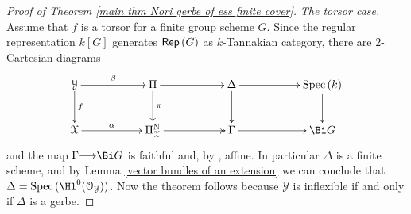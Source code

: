 \documentclass[12pt,reqno]{amsart}
\theoremstyle{plain}
\theoremstyle{definition}
\numberwithin{thm}{section}
\newcounter{x}\setcounter{x}{1}
\theoremstyle{plain}
\begin{document}
\begin{proof}[Proof of Theorem \ref{main thm Nori gerbe of ess finite cover}]
\emph{The torsor case.} Assume that $f$ is a torsor for a finite group scheme $G$. Since the regular
representation $k[G]$ generates ${\text{\sf Rep\,}}(G)$ as $k$-Tannakian category, there are $2$-Cartesian diagrams
$$
\xymatrix{{{\mathcal Y}}\ar[rr]^-\beta\ar[d]^-f&&\Pi\ar[d]^-\pi\ar[rr]&&\Delta\ar[rr]\ar[d]&&{{\rm Spec \,}}(k)\ar[d]\\ {{\mathcal X}}\ar[rr]^-\alpha && \Pi_{{\mathcal X}}^{\textup{N}}\ar@{>>}[rr]&&\Gamma\ar[rr]^-{}&&\Bi G}
$$
and the map $\Gamma{\longrightarrow} \Bi G$ is faithful and, by \cite[Remark B.7]{TZ}, affine. In particular
$\Delta$ is a finite scheme, and by Lemma \ref{vector bundles of an extension} we can conclude
that $\Delta={{\rm Spec \,}}(\Hl^0({\mathcal{O}_{\mathcal{Y}}}))$. Now the theorem follows because ${\mathcal{Y}}$ is inflexible if and only if $\Delta$ is a gerbe.
 \end{proof}
\end{document}
